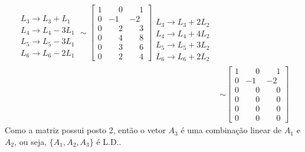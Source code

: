 \begin{exemplo}
\begin{enumerate}[label={\arabic*})]
\begin{solucao}
\begin{align*}
\begin{array}{l}
     					\phantom{x}\\
     					L_3 \to L_3 + L_1\\
     					L_4 \to L_4 - 3L_1\\
     					L_5 \to L_5 - 3L_1\\
     					L_6 \to L_6 - 2L_1
     				\end{array} \sim
     				\left[
     					\begin{array}{ccc}
		  					1 & \phantom{-}0 & \phantom{-}1\\
							0 & -1 & -2\\
							0 & \phantom{-}2 & \phantom{-}3\\
							0 & \phantom{-}4 & \phantom{-}8\\
							0 & \phantom{-}3 & \phantom{-}6\\
							0 & \phantom{-}2 & \phantom{-}4
     					\end{array}
     				\right]
     				\begin{array}{l}
     					\phantom{x}\\
     					\phantom{x}\\
     					L_3 \to L_3 + 2L_2\\
     					L_4 \to L_4 + 4L_2\\
     					L_5 \to L_5 + 3L_2\\
     					L_6 \to L_6 + 2L_2
     				\end{array}\\ &\sim
     				\left[
     					\begin{array}{ccc}
		  					1 & \phantom{-}0 & \phantom{-}1\\
							0 & -1 & -2\\
							0 & \phantom{-}0 & \phantom{-}0\\
							0 & \phantom{-}0 & \phantom{-}0\\
							0 & \phantom{-}0 & \phantom{-}0\\
							0 & \phantom{-}0 & \phantom{-}0
     					\end{array}
     				\right]
     		\end{align*}
     		Como a matriz possui posto 2, ent\~ao o vetor $A_3$ \'e uma combina\c{c}\~ao linear de $A_1$ e $A_2$, ou seja, $\{A_1, A_2, A_3\}$ \'e L.D..
		\end{solucao}
	\end{enumerate}
\end{exemplo}

